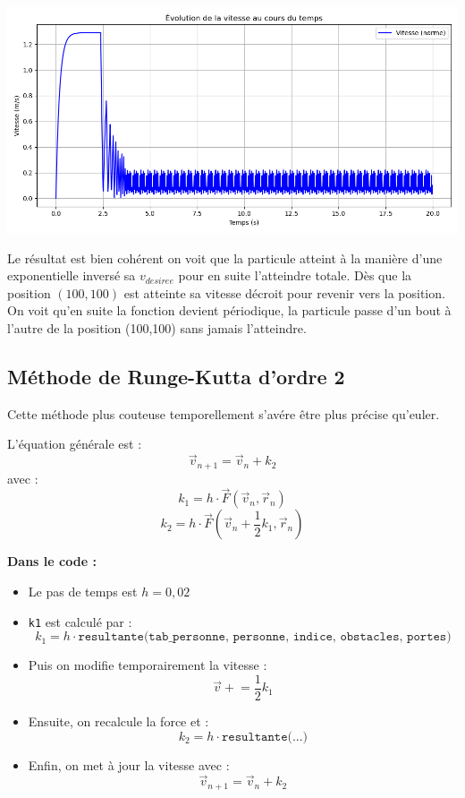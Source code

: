 \documentclass[a4paper,12pt]{article}
\begin{document}
\includegraphics[width=\textwidth]{graph_vitesse.png} %

Le résultat est bien cohérent on voit que la particule atteint à la manière d'une exponentielle inversé sa $v_{desiree}$ pour en suite l'atteindre totale. Dès que la position $(100,100)$ est atteinte sa vitesse décroit pour revenir vers la position. On voit qu'en suite la fonction devient périodique, la particule passe d'un bout à l'autre de la position (100,100) sans jamais l'atteindre.


\subsection*{Méthode de Runge-Kutta d'ordre 2}

Cette méthode plus couteuse temporellement s'avére être plus précise qu'euler.

L’équation générale est :
\[
\vec{v}_{n+1} = \vec{v}_n + k_2
\]
avec :
\[
k_1 = h \cdot \vec{F}(\vec{v}_n, \vec{r}_n)
\]
\[
k_2 = h \cdot \vec{F} \left( \vec{v}_n + \frac{1}{2}k_1, \vec{r}_n \right)
\]

\textbf{Dans le code :}
\begin{itemize}
    \item Le pas de temps est $h = 0{,}02$
    \item \texttt{k1} est calculé par :
    \[
    k_1 = h \cdot \texttt{resultante(tab\_personne, personne, indice, obstacles, portes)}
    \]
    \item Puis on modifie temporairement la vitesse :
    \[
    \vec{v} \mathrel{+}= \frac{1}{2} k_1
    \]
    \item Ensuite, on recalcule la force et :
    \[
    k_2 = h \cdot \texttt{resultante(...)}
    \]
    \item Enfin, on met à jour la vitesse avec :
    \[
    \vec{v}_{n+1} = \vec{v}_n + k_2
    \]
\end{itemize}
\end{document}

